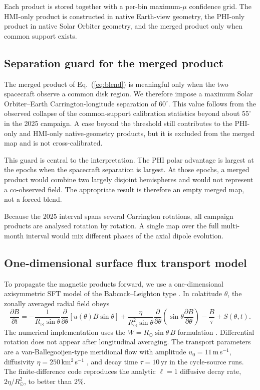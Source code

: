 \documentclass{aa}
\begin{document}
Each product is stored together with a per-bin maximum-$\mu$ confidence grid. The HMI-only product is constructed in native Earth-view geometry, the PHI-only product in native Solar Orbiter geometry, and the merged product only when common support exists.

\subsection{Separation guard for the merged product}
\label{sec:methods-guard}

The merged product of Eq.~(\ref{eq:blend}) is meaningful only when the two spacecraft observe a common disk region. We therefore impose a maximum Solar Orbiter--Earth Carrington-longitude separation of $60^{\circ}$. This value follows from the observed collapse of the common-support calibration statistics beyond about $55^{\circ}$ in the 2025 campaign. A case beyond the threshold still contributes to the PHI-only and HMI-only native-geometry products, but it is excluded from the merged map and is not cross-calibrated.

This guard is central to the interpretation. The PHI polar advantage is largest at the epochs when the spacecraft separation is largest. At those epochs, a merged product would combine two largely disjoint hemispheres and would not represent a co-observed field. The appropriate result is therefore an empty merged map, not a forced blend.

Because the 2025 interval spans several Carrington rotations, all campaign products are analysed rotation by rotation. A single map over the full multi-month interval would mix different phases of the axial dipole evolution.

\subsection{One-dimensional surface flux transport model}
\label{sec:methods-sft}

To propagate the magnetic products forward, we use a one-dimensional axisymmetric SFT model of the Babcock--Leighton type \citep{Babcock1961,Leighton1969,Sheeley2005}. In colatitude $\theta$, the zonally averaged radial field obeys
\begin{equation}
\frac{\partial B}{\partial t} =
-\frac{1}{R_{\odot}\sin\theta}
\frac{\partial}{\partial\theta}\left[u(\theta)B\sin\theta\right]
+\frac{\eta}{R_{\odot}^{2}\sin\theta}
\frac{\partial}{\partial\theta}
\left(\sin\theta\frac{\partial B}{\partial\theta}\right)
-\frac{B}{\tau}+S(\theta,t).
\label{eq:sft}
\end{equation}
The numerical implementation uses the $W=R_{\odot}\sin\theta\,B$ formulation \citep{WangSheeley1991}. Differential rotation does not appear after longitudinal averaging. The transport parameters are a van-Ballegooijen-type meridional flow with amplitude $u_0=11$\,m\,s$^{-1}$, diffusivity $\eta=250$\,km$^2$\,s$^{-1}$ \citep{vanBallegooijen1998,Wang2017}, and decay time $\tau=10$\,yr in the cycle-source runs. The finite-difference code reproduces the analytic $\ell=1$ diffusive decay rate, $2\eta/R_{\odot}^{2}$, to better than 2\%.
\end{document}
